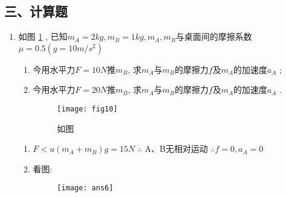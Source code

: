 \subsection*{三、计算题}
\begin{enumerate}
    \item 如图 \ref{Fig:10} , 已知$m_A=2kg, m_B=1kg, m_A, m_B$与桌面间的摩擦系数$\mu=0.5(g=10m/s^2)$
    \begin{enumerate}
    \item[(1)] 今用水平力$F=10N$推$m_B$, 求$m_A$与$m_B$的摩擦力$f$及$m_A$的加速度$a_A$ ;
    \item[(2)] 今用水平力$F=20N$推$m_B$, 求$m_A$与$m_B$的摩擦力$f$及$m_A$的加速度$a_A$ .
        \begin{figure}[H]
            \centering
            \texttt{[image: fig10]}
            \caption{如图}\label{Fig:10}
        \end{figure}
    \end{enumerate}
    \begin{solution}
        \begin{enumerate}
           \item[(1)]   $F<u(m_A+m_B)g=15N$  $\therefore$ A、B无相对运动  $\therefore f=0,a_A=0$
           \item[(2)]     看图: 
         
           \begin{figure}[H]
               \centering
               \texttt{[image: ans6]}
           \end{figure}
        \end{enumerate}
        

\end{solution}
\end{enumerate}
